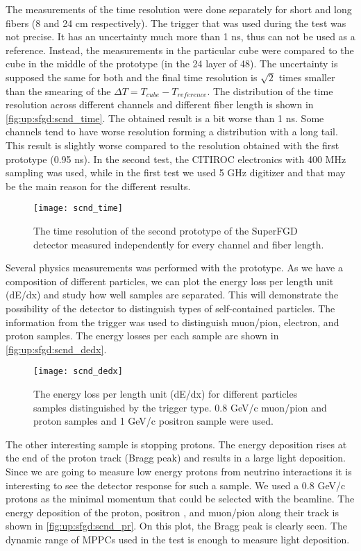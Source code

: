 \documentclass[main.tex]{subfiles}
\begin{document}
The measurements of the time resolution were done separately for short and long fibers (8 and 24 cm respectively). The trigger that was used during the test was not precise. It has an uncertainty much more than 1 ns, thus can not be used as a reference. Instead, the measurements in the particular cube were compared to the cube in the middle of the prototype (in the 24 layer of 48). The uncertainty is supposed the same for both and the final time resolution is $\sqrt{2}$ times smaller than the smearing of the $\Delta T=T_{cube}-T_{reference}$. The distribution of the time resolution across different channels and different fiber length is shown in \autoref{fig:up:sfgd:scnd_time}. The obtained result is a bit worse than 1 ns. Some channels tend to have worse resolution forming a distribution with a long tail. This result is slightly worse compared to the resolution obtained with the first prototype (0.95 ns). In the second test, the CITIROC electronics with 400 MHz sampling was used, while in the first test we used 5 GHz digitizer and that may be the main reason for the different results.

\begin{figure}[!ht]
	\centering
	\texttt{[image: scnd\_time]}
	\caption{The time resolution of the second prototype of the SuperFGD detector measured independently for every channel and fiber length.}
	\label{fig:up:sfgd:scnd_time}
\end{figure}

Several physics measurements was performed with the prototype. As we have a composition of different particles, we can plot the energy loss per length unit (dE/dx) and study how well samples are separated. This will demonstrate the possibility of the detector to distinguish types of self-contained particles. The information from the trigger was used to distinguish muon/pion, electron, and proton samples. The energy losses per each sample are shown in \autoref{fig:up:sfgd:scnd_dedx}.

\begin{figure}[!ht]
	\centering
	\texttt{[image: scnd\_dedx]}
	\caption{The energy loss per length unit (dE/dx) for different particles samples distinguished by the trigger type. 0.8 GeV/c muon/pion and proton samples and 1 GeV/c positron sample were used.}
	\label{fig:up:sfgd:scnd_dedx}
\end{figure}

The other interesting sample is stopping protons. The energy deposition rises at the end of the proton track (Bragg peak) and results in a large light deposition. Since we are going to measure low energy protons from neutrino interactions it is interesting to see the detector response for such a sample. We used a 0.8 GeV/c protons as the minimal momentum that could be selected with the beamline. The energy deposition of the proton, positron , and muon/pion along their track is shown in \autoref{fig:up:sfgd:scnd_pr}. On this plot, the Bragg peak is clearly seen. The dynamic range of MPPCs used in the test is enough to measure light deposition.
\end{document}
